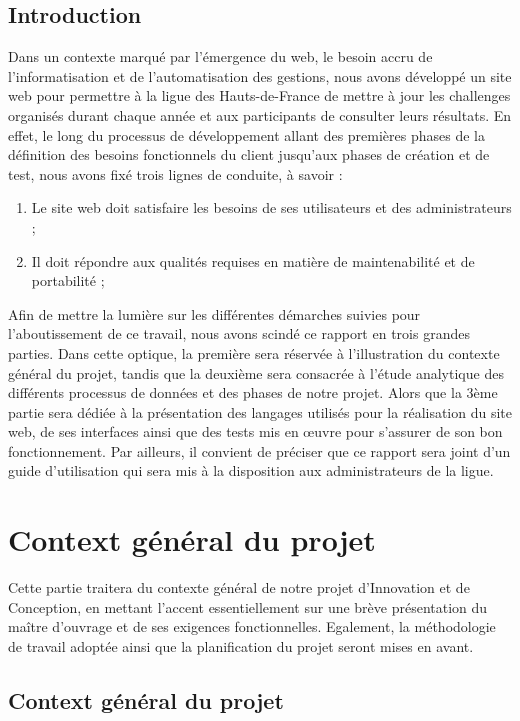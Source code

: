 \documentclass[12pt,a4paper]{report}
\begin{document}
	\section*{Introduction}
	Dans un contexte marqué par l’émergence du web, le besoin accru de l’informatisation et de l’automatisation des gestions, nous avons développé un site web pour permettre à la ligue des Hauts-de-France de mettre à jour les challenges organisés durant chaque année et aux participants de consulter leurs résultats.
	En effet, le long du processus de développement allant des premières phases de la définition des besoins fonctionnels du client jusqu’aux phases de création et de test, nous avons fixé trois lignes de conduite, à savoir :
	\begin{enumerate}
	\item Le site web doit satisfaire les besoins de ses utilisateurs et des administrateurs ;
	\item Il doit répondre aux qualités requises en matière de maintenabilité et de portabilité ;
	\end{enumerate}
	Afin de mettre la lumière sur les différentes démarches suivies pour l’aboutissement de ce travail, nous avons scindé ce rapport en trois grandes parties. Dans cette optique, la première sera réservée à l’illustration du contexte général du projet, tandis que la deuxième sera consacrée à l’étude analytique des différents processus de données et des phases de notre projet. Alors que la 3ème partie sera dédiée à la présentation des langages utilisés pour la réalisation du site web, de ses interfaces ainsi que des tests mis en œuvre pour s’assurer de son bon fonctionnement. Par ailleurs, il convient de préciser que ce rapport sera joint d’un guide d’utilisation qui sera mis à la disposition aux administrateurs de la ligue.
	\chapter{Context général du projet}
	Cette partie traitera du contexte général de notre projet d’Innovation et de Conception, en mettant l’accent essentiellement sur une brève présentation du maître d'ouvrage et de ses exigences fonctionnelles. Egalement, la méthodologie de travail adoptée ainsi que la planification du projet seront mises en avant.  
	
	\newpage
	\section {Context général du projet}
\end{document}
